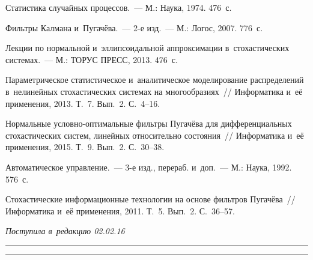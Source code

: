 \begin{multicols}{2}
{{\begin{thebibliography}{9}
Статистика случайных процессов.~--- М.: Наука, 1974. 476~с.

Фильтры Калмана и~Пугачёва.~--- 2-е изд.~--- М.: Логос, 2007. 776~с.

Лекции по нормальной и~эллипсоидальной аппроксимации в~стохастических системах.~--- 
М.: ТОРУС ПРЕСС, 2013. 476~с.

Параметрическое статистическое и~аналитическое моделирование распределений 
в~нелинейных стохастических системах на многообразиях~// 
Информатика и~её применения, 2013. Т.~7. Вып.~2. С.~4--16.

Нормальные услов\-но-оп\-ти\-маль\-ные фильтры Пугачёва для дифференциальных 
стохастических систем, линейных относительно состояния~// Информатика и~её 
применения, 2015. Т.~9. Вып.~2. С.~30--38.

 Автоматическое управление.~---
 3-е изд., перераб. и~доп.~--- М.: Наука, 1992. 576~с.

Стохастические информационные технологии на основе фильтров Пугачёва~// 
Информатика и~её применения, 2011. Т.~5. Вып.~2. С.~36--57.
\end{thebibliography}

 }
 }

\end{multicols}

\vspace*{-3pt}

\hfill{\small\textit{Поступила в~редакцию 02.02.16}}

\vspace*{8pt}



\hrule

\vspace*{2pt}

\hrule




\def\tit{NORMAL PUGACHEV CONDITIONALLY-OPTIMAL
FILTERS  AND~EXTRAPOLATORS FOR~STATE
LINEAR STOCHASTIC SYSTEMS}

\def\titkol{Normal Pugachev conditionally-optimal
filters  and~extrapolators for~state
linear stochastic systems}


